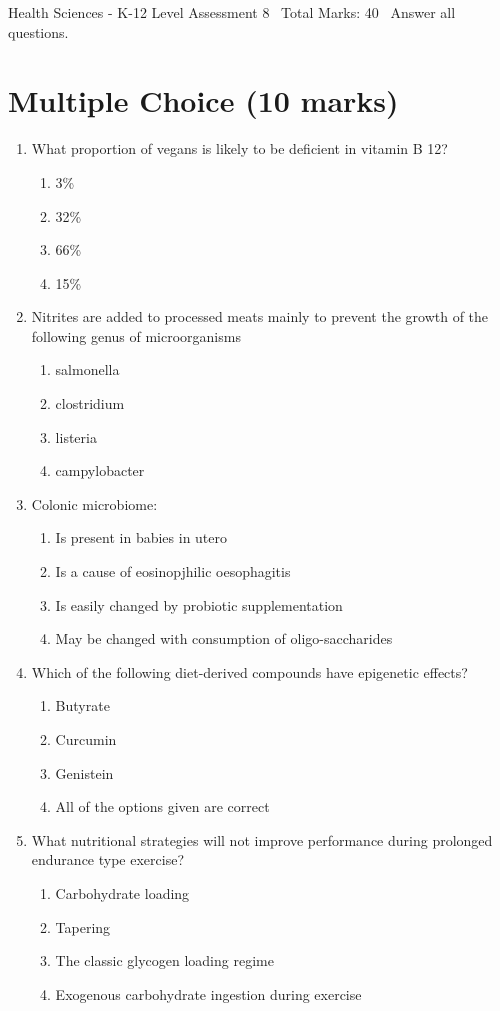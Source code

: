 \documentclass[12pt]{article}
\begin{document}
\begin{center}
Health Sciences - K-12 Level Assessment 8 \
Total Marks: 40 \
Answer all questions.
\end{center}

\section*{Multiple Choice (10 marks)}
\begin{enumerate}[label=\arabic*.]
\item What proportion of vegans is likely to be deficient in vitamin B 12?
\begin{enumerate}[label=(\alph*)]
    \item 3\%
    \item 32\%
    \item 66\%
    \item 15\%
\end{enumerate}
\item Nitrites are added to processed meats mainly to prevent the growth of the following genus of microorganisms
\begin{enumerate}[label=(\alph*)]
    \item salmonella
    \item clostridium
    \item listeria
    \item campylobacter
\end{enumerate}
\item Colonic microbiome:
\begin{enumerate}[label=(\alph*)]
    \item Is present in babies in utero
    \item Is a cause of eosinopjhilic oesophagitis
    \item Is easily changed by probiotic supplementation
    \item May be changed with consumption of oligo-saccharides
\end{enumerate}
\item Which of the following diet-derived compounds have epigenetic effects?
\begin{enumerate}[label=(\alph*)]
    \item Butyrate
    \item Curcumin
    \item Genistein
    \item All of the options given are correct
\end{enumerate}
\item What nutritional strategies will not improve performance during prolonged endurance type exercise?
\begin{enumerate}[label=(\alph*)]
    \item Carbohydrate loading
    \item Tapering
    \item The classic glycogen loading regime
    \item Exogenous carbohydrate ingestion during exercise
\end{enumerate}
\end{enumerate}
\end{document}
